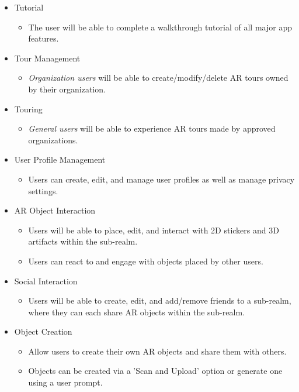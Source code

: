 \documentclass{article}
\begin{document}
\begin{itemize}
    \item Tutorial
    \begin{itemize}
        \item The user will be able to complete a walkthrough tutorial of all major app features.
    \end{itemize}

    \item Tour Management
    \begin{itemize}
        \item \textit{Organization users} will be able to create/modify/delete AR tours owned by their organization.
    \end{itemize}

    \item Touring
    \begin{itemize}
        \item \textit{General users} will be able to experience AR tours made by approved organizations.
    \end{itemize}

    \item User Profile Management
    \begin{itemize}
        \item Users can create, edit, and manage user profiles as well as manage privacy settings.
    \end{itemize}

    \item AR Object Interaction
    \begin{itemize}
        \item Users will be able to place, edit, and interact with 2D stickers and 3D artifacts within the sub-realm.
        \item Users can react to and engage with objects placed by other users.
    \end{itemize}

    \item Social Interaction
    \begin{itemize}
        \item Users will be able to create, edit, and add/remove friends to a sub-realm, where they can each share AR objects within the sub-realm.
    \end{itemize}

    \item Object Creation
    \begin{itemize}
        \item Allow users to create their own AR objects and share them with others.
        \item Objects can be created via a 'Scan and Upload' option or generate one using a user prompt.
    \end{itemize}


\end{itemize}
\end{document}
